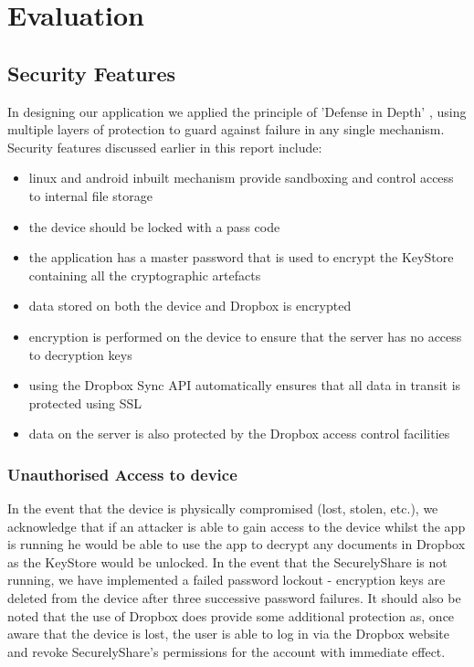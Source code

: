 
\chapter{Evaluation}
\label{cha:eval}
\section{Security Features}
\label{sec:security}
In designing our application we applied the principle of 'Defense in Depth' \citep{nsa}, using multiple layers of protection to guard against failure in any single mechanism.  Security features discussed earlier in this report include:
\begin{itemize}
\item linux and android inbuilt mechanism provide sandboxing and control access to internal file storage
\item the device should be locked with a pass code
\item the application has a master password that is used to encrypt the KeyStore containing all the cryptographic artefacts
\item data stored on both the device and Dropbox is encrypted 
\item encryption is performed on the device to ensure that the server has no access to decryption keys
\item using the Dropbox Sync API automatically ensures that all data in transit is protected using SSL
\item data on the server is also protected by the Dropbox access control facilities
\end{itemize}





\subsection*{Unauthorised Access to device}
In the event that the device is physically compromised (lost, stolen, etc.), we acknowledge that if an attacker is able to gain access to the device whilst the app is running he would be able to use the app to decrypt any documents in Dropbox as the KeyStore would be unlocked.  In the event that the SecurelyShare is not running, we have implemented a failed password lockout - encryption keys are deleted from the device after three successive password failures.  It should also be noted  that the use of Dropbox does provide some additional protection as, once aware that the device is lost, the user is able to log in via the Dropbox website and revoke SecurelyShare's permissions for the account with immediate effect. 

